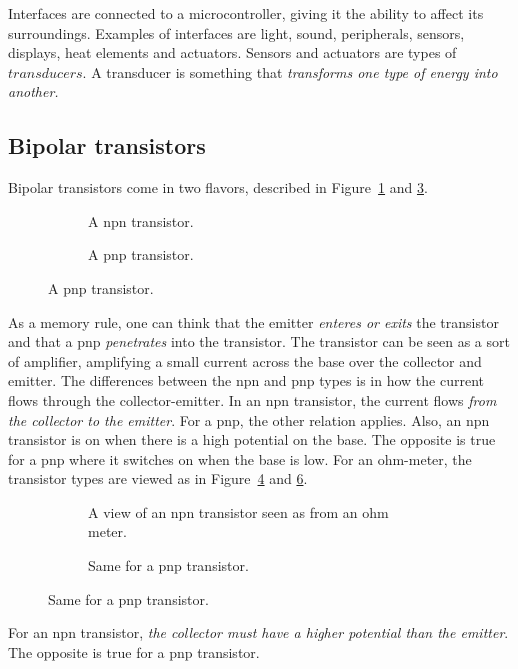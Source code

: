 Interfaces are connected to a microcontroller, giving it the ability to affect
its surroundings. Examples of interfaces are light, sound, peripherals, sensors,
displays, heat elements and actuators. Sensors and actuators are types of
$transducers$. A transducer is something that \textit{transforms one type of energy into another.}
\subsection*{Bipolar transistors}
Bipolar transistors come in two flavors, described in Figure~\ref{fig:npn}
and \ref{fig:pnp}.
\begin{figure}[H]
\centering
\begin{subfigure}{.5\textwidth}
    \centering
    
    \caption{A npn transistor.}
    \label{fig:npn}
\end{subfigure}%
\begin{subfigure}{.5\textwidth}
    \centering
    
    \caption{A pnp transistor.}
    \label{fig:pnp}
\end{subfigure}
\end{figure}
As  a memory rule, one can think that the emitter \textit{enteres or exits} the
transistor and that a pnp \textit{penetrates} into the transistor. The
transistor can be seen as a sort of amplifier, amplifying a small current across
the base over the collector and emitter. The differences between the npn and pnp
types is in how the current flows through the collector-emitter. In an npn
transistor, the current flows \textit{from the collector to the emitter}. For a
pnp, the other relation applies. Also, an npn transistor is on when there is a
high potential on the base. The opposite is true for a pnp where it switches on
when the base is low. For an ohm-meter, the transistor types are
viewed as in Figure~\ref{fig:npndiode} and \ref{fig:pnpdiode}.
\begin{figure}[H]
\centering
\begin{subfigure}{.5\textwidth}
    \centering
    
    \caption{A view of an npn transistor seen as from an ohm meter.}
    \label{fig:npndiode}
\end{subfigure}%
\begin{subfigure}{.5\textwidth}
    \centering
    
    \caption{Same for a pnp transistor.}
    \label{fig:pnpdiode}
\end{subfigure}
\end{figure}
For an npn transistor, \textit{the collector must have a higher potential than
the emitter}. The opposite is true for a pnp transistor. 
